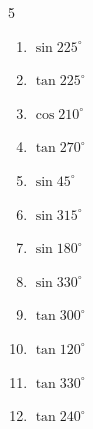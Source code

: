 \begin{multicols}{5}
\begin{enumerate}
        \phantom{$\displaystyle =-1$}

  \item $\displaystyle \sin{225^\circ}$


  \item $\displaystyle \tan{225^\circ}$

        \phantom{$\displaystyle =1$}

  \item $\displaystyle \cos{210^\circ}$


  \item $\displaystyle \tan{270^\circ}$

        \phantom{$\displaystyle なし$}

  \item $\displaystyle \sin{45^\circ}$


\columnbreak %

  \item $\displaystyle \sin{315^\circ}$


  \item $\displaystyle \sin{180^\circ}$

        \phantom{$\displaystyle =0$}

  \item $\displaystyle \sin{330^\circ}$


  \item $\displaystyle \tan{300^\circ}$


  \item $\displaystyle \tan{120^\circ}$


  \item $\displaystyle \tan{330^\circ}$


  \item $\displaystyle \tan{240^\circ}$



\end{enumerate}
\end{multicols}

